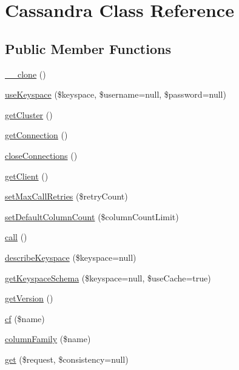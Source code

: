 \hypertarget{classCassandra}{
\section{Cassandra Class Reference}
\label{classCassandra}
}
\subsection*{Public Member Functions}
\begin{DoxyCompactItemize}
\item 
\hyperlink{classCassandra_abb13b5073e065e8f2a60b1c6f18c573e}{\_\-\_\-clone} ()
\item 
\hyperlink{classCassandra_a4502befdb4278113462bc7fcfbafa09f}{useKeyspace} (\$keyspace, \$username=null, \$password=null)
\item 
\hyperlink{classCassandra_ad8fe43e1ceb9841cca92cf981fb566b3}{getCluster} ()
\item 
\hyperlink{classCassandra_ac300f4b8ed3a2d80388225e0ec990883}{getConnection} ()
\item 
\hyperlink{classCassandra_a382ebe135b67bddef1e0a9fa21448cde}{closeConnections} ()
\item 
\hyperlink{classCassandra_a4eaaed3e996a26cc145057487036584b}{getClient} ()
\item 
\hyperlink{classCassandra_aea614dd2c8170609c0ec9e81607983a0}{setMaxCallRetries} (\$retryCount)
\item 
\hyperlink{classCassandra_af62c6e8771c55cfe9a94e8a6551a5e1b}{setDefaultColumnCount} (\$columnCountLimit)
\item 
\hyperlink{classCassandra_a5a83ae74dca462d6d7527c2a682ae550}{call} ()
\item 
\hyperlink{classCassandra_a6ba87c8d96b73a8b13f61711c5df9e52}{describeKeyspace} (\$keyspace=null)
\item 
\hyperlink{classCassandra_a67612b010f1a48882ca0ad6888fab31f}{getKeyspaceSchema} (\$keyspace=null, \$useCache=true)
\item 
\hyperlink{classCassandra_a3291b2ab3dc093e22df8a428321f2492}{getVersion} ()
\item 
\hyperlink{classCassandra_a4d61f35bafba5e3e2b82b33671ce7831}{cf} (\$name)
\item 
\hyperlink{classCassandra_a4e450d22e7ae8575cca647970edb54d5}{columnFamily} (\$name)
\item 
\hyperlink{classCassandra_ad2f8866d598ac0f696cb0c87258133fb}{get} (\$request, \$consistency=null)
\item 

\end{DoxyCompactItemize}
